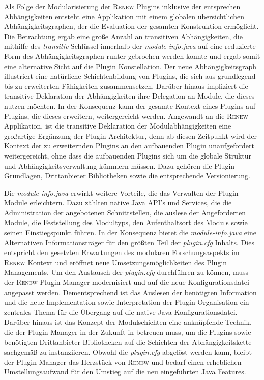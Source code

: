 Als Folge der Modularisierung der \textsc{Renew} Plugins inklusive der entsprechen Abhängigkeiten entsteht eine Applikation mit einem globalen übersichtlichen Abhängigkeitsgraphen, der die Evaluation der gesamten Konstruktion ermöglicht. Die Betrachtung ergab eine große Anzahl an transitiven Abhängigkeiten, die mithilfe des \textit{transitiv} Schlüssel innerhalb der \textit{module-info.java} auf eine reduzierte Form des Abhängigkeitsgraphen runter gebrochen werden konnte und ergab somit eine alternative Sicht auf die Plugin Konstellation. Der neue Abhängigkeitsgraph illustriert eine natürliche Schichtenbildung von Plugins, die sich aus grundlegend bis zu erweiterten Fähigkeiten zusammensetzen. Darüber hinaus impliziert die transitive Deklaration der Abhängigkeiten ihre Delegation an Module, die dieses nutzen möchten. In der Konsequenz kann der gesamte Kontext eines Plugins auf Plugins, die dieses erweitern, weitergereicht werden. \newline
Angewandt an die \textsc{Renew} Applikation, ist die transitive Deklaration der Modulabhängigkeiten eine großartige Ergänzung der Plugin Architektur, denn ab diesen Zeitpunkt wird der Kontext der zu erweiternden Plugins an den aufbauenden Plugin unaufgefordert weitergereicht, ohne dass die aufbauenden Plugins sich um die globale Struktur und Abhängigkeitsverwaltung kümmern müssen. Dazu gehören die Plugin Grundlagen, Drittanbieter Bibliotheken sowie die entsprechende Versionierung.\bigbreak

Die \textit{module-info.java} erwirkt weitere Vorteile, die das Verwalten der Plugin Module erleichtern. Dazu zählten native Java API's und Services, die die Administration der angebotenen Schnittstellen, die auslese der Angeforderten Module, die Feststellung des Modultyps, den Aufenthaltsort des Moduls sowie seinen Einstiegspunkt  führen. In der Konsequenz bietet die \textit{module-info.java} eine Alternativen Informationsträger für den größten Teil der \textit{plugin.cfg} Inhalts. Dies entspricht den gesetzten Erwartungen des modularen Forschungsaspekts im \textsc{Renew} Kontext und eröffnet neue Umsetzungsmöglichkeiten des Plugin Managements.\newline
Um den Austausch der \textit{plugin.cfg} durchführen zu können, muss der \textsc{Renew} Plugin Manager modernisiert und auf die neue Konfigurationsdatei angepasst werden. Dementsprechend ist das Auslesen der benötigten Information und die neue Implementation sowie Interpretation der Plugin Organisation ein zentrales Thema für die Übergang auf die native Java Konfigurationsdatei. Darüber hinaus ist das Konzept der Modulschichten eine anknüpfende Technik, die der Plugin Manager in der Zukunft in betreuen muss, um die Plugins sowie benötigten Drittanbieter-Bibliotheken auf die Schichten der Abhängigkeitskette sachgemäß zu instanziieren.\newline
Obwohl die \textit{plugin.cfg} abgelöst werden kann, bleibt der Plugin Manager das Herzstück von \textsc{Renew} und bedarf einen erheblichen Umstellungsaufwand für den Umstieg auf die neu eingeführten Java Features.\bigbreak

